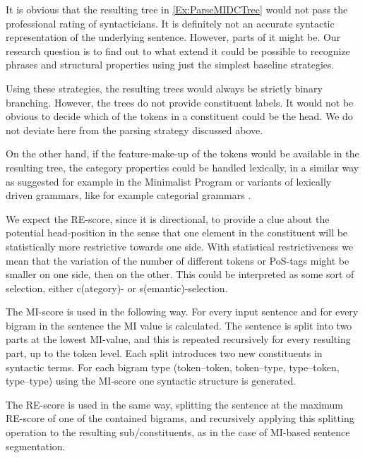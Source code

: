 \documentclass[11pt,a4paper,english]{article}
\begin{document}

It is obvious that the resulting tree in \ref{Ex:ParseMIDCTree} would not pass the professional rating of syntacticians. It is definitely not an accurate syntactic representation of the underlying sentence. However, parts of it might be. Our research question is to find out to what extend it could be possible to recognize phrases and structural properties using just the simplest baseline strategies.

Using these strategies, the resulting trees would always be strictly binary branching. However, the trees do not provide constituent labels. It would not be obvious to decide which of the tokens in a constituent could be the head. We do not deviate here from the parsing strategy discussed above.

On the other hand, if the feature-make-up of the tokens would be available in the resulting tree, the category properties could be handled lexically, in a similar way as suggested for example in the Minimalist Program \citep{Chomsky:1995} or variants of lexically driven grammars, like for example categorial grammars \citep[e.g.][]{Steedman:2001}.

We expect the RE-score, since it is directional, to provide a clue about the potential head-position in the sense that one element in the constituent will be statistically more restrictive towards one side. With statistical restrictiveness we mean that the variation of the number of different tokens or PoS-tags might be smaller on one side, then on the other. This could be interpreted as some sort of selection, either c(ategory)- or s(emantic)-selection.


The MI-score is used in the following way. For every input sentence and for every bigram in the sentence the MI value is calculated. The sentence is split into two parts at the lowest MI-value, and this is repeated recursively for every resulting part, up to the token level. Each split introduces two new constituents in syntactic terms. For each bigram type (token--token, token--type, type--token, type--type) using the MI-score one syntactic structure is generated.

The RE-score is used in the same way, splitting the sentence at the maximum RE-score of one of the contained bigrams, and recursively applying this splitting operation to the resulting sub/constituents, as in the case of MI-based sentence segmentation.
\end{document}
